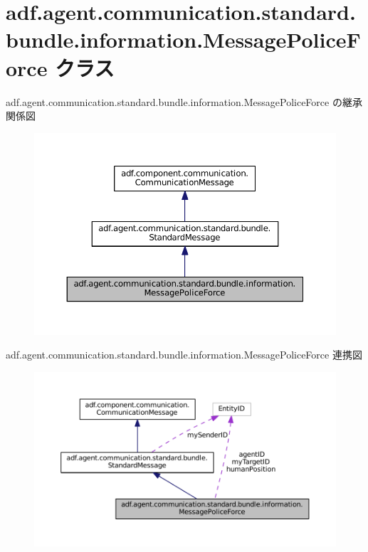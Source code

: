 \hypertarget{classadf_1_1agent_1_1communication_1_1standard_1_1bundle_1_1information_1_1MessagePoliceForce}{}\section{adf.\+agent.\+communication.\+standard.\+bundle.\+information.\+Message\+Police\+Force クラス}
\label{classadf_1_1agent_1_1communication_1_1standard_1_1bundle_1_1information_1_1MessagePoliceForce}


adf.\+agent.\+communication.\+standard.\+bundle.\+information.\+Message\+Police\+Force の継承関係図
\nopagebreak
\begin{figure}[H]
\begin{center}
\leavevmode
\includegraphics[width=350pt]{classadf_1_1agent_1_1communication_1_1standard_1_1bundle_1_1information_1_1MessagePoliceForce__inherit__graph}
\end{center}
\end{figure}


adf.\+agent.\+communication.\+standard.\+bundle.\+information.\+Message\+Police\+Force 連携図
\nopagebreak
\begin{figure}[H]
\begin{center}
\leavevmode
\includegraphics[width=350pt]{classadf_1_1agent_1_1communication_1_1standard_1_1bundle_1_1information_1_1MessagePoliceForce__coll__graph}
\end{center}
\end{figure}
